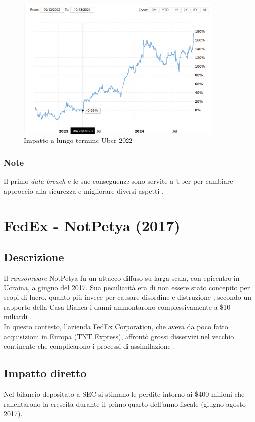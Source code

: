\documentclass[12pt,a4paper,twoside]{report}
\begin{document}
\begin{figure}[H] 
\begin{center} 
\includegraphics[width=10cm]{figures/uber_2022_long.png} 
\caption[Grafico Uber 2022 long]{Impatto a lungo termine Uber 2022}\label{fig:ubr2}
\end{center}
\end{figure}

\subsubsection{Note}
Il primo \textit{data breach} e le sue conseguenze sono servite a Uber per cambiare approccio alla sicurezza e migliorare diversi aspetti \cite{Uber_2022}.

\section{FedEx - NotPetya (2017)}
\subsection{Descrizione}
Il \textit{ransomware} NotPetya fu un attacco diffuso su larga scala, con epicentro in Ucraina, a giugno del 2017. Sua  peculiarit\`a era di non essere stato concepito per scopi di lucro, quanto pi\`u invece per causare disordine e distruzione \cite{FedEx_evolutionOfRansom}, secondo un rapporto della Casa Bianca i danni ammontarono complessivamente a \$10 miliardi \cite{FedEx_wired}.\\
In questo contesto, l'azienda FedEx Corporation, che aveva da poco fatto acquisizioni in Europa (TNT Express), affront\`o grossi disservizi nel vecchio continente che complicarono i processi di assimilazione \cite{FedEx_10K_report_2018}.\\
\subsection{Impatto diretto}
Nel bilancio depositato a SEC si stimano le perdite intorno ai \$400 milioni che rallentarono la crescita durante il primo quarto dell'anno fiscale (giugno-agosto 2017).\\
\end{document}
